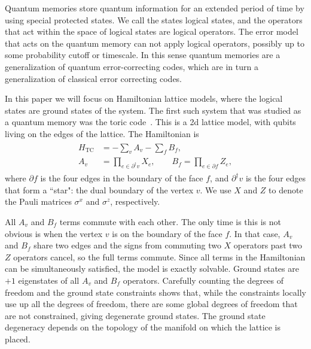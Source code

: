 Quantum memories store quantum information for an extended period of time by using special protected states. We call the states logical states, and the operators that act within the space of logical states are logical operators. The error model that acts on the quantum memory can not apply logical operators, possibly up to some probability cutoff or timescale. 
In this sense quantum memories are a generalization of quantum error-correcting codes, which are in turn a generalization of classical error correcting codes.

In this paper we will focus on Hamiltonian lattice models, where the logical states are ground states of the system. The first such system that was studied as a quantum memory was the toric code~\cite{Kitaev2003Fault}. This is a 2d lattice model, with qubits living on the edges of the lattice. The Hamiltonian is 
\begin{align}
\begin{aligned}
H_\text{TC} &= -\sum_v A_v - \sum_f B_f,\\
A_v &= \prod_{e\in\partial^\dag v} X_e,\qquad B_f = \prod_{e \in \partial f} Z_e, \label{eq:HTC}
\end{aligned}
\end{align}
where $\partial f$ is the four edges in the boundary of the face $f$, and $\partial^\dag v$ is the four edges that form a ``star": the dual boundary of the vertex $v$.  We use $X$ and $Z$ to denote the Pauli matrices $\sigma^x$ and $\sigma^z$, respectively.

All $A_v$ and $B_f$ terms commute with each other. The only time is this is not obvious is when the vertex $v$ is on the boundary of the face $f$. In that case, $A_v$ and $B_f$ share two edges and the signs from commuting two $X$ operators past two $Z$ operators cancel, so the full terms commute. Since all terms in the Hamiltonian can be simultaneously satisfied, the model is exactly solvable. Ground states are $+1$ eigenstates of all $A_v$ and $B_f$ operators. Carefully counting the degrees of freedom and the ground state constraints shows that, while the constraints locally use up all the degrees of freedom, there are some global degrees of freedom that are not constrained, giving degenerate ground states.
The ground state degeneracy depends on the topology of the manifold on which the lattice is placed. 

